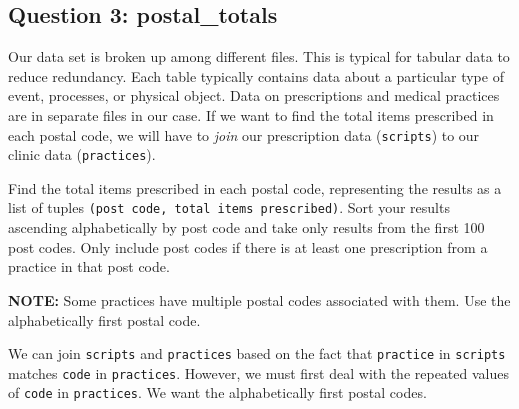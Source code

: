 \documentclass[11pt]{article}
\begin{document}
    \hypertarget{question-3-postal_totals}{%
\subsection{Question 3: postal\_totals}\label{question-3-postal_totals}}

Our data set is broken up among different files. This is typical for
tabular data to reduce redundancy. Each table typically contains data
about a particular type of event, processes, or physical object. Data on
prescriptions and medical practices are in separate files in our case.
If we want to find the total items prescribed in each postal code, we
will have to \emph{join} our prescription data (\texttt{scripts}) to our
clinic data (\texttt{practices}).

Find the total items prescribed in each postal code, representing the
results as a list of tuples
\texttt{(post\ code,\ total\ items\ prescribed)}. Sort your results
ascending alphabetically by post code and take only results from the
first 100 post codes. Only include post codes if there is at least one
prescription from a practice in that post code.

\textbf{NOTE:} Some practices have multiple postal codes associated with
them. Use the alphabetically first postal code.

    We can join \texttt{scripts} and \texttt{practices} based on the fact
that \texttt{\textquotesingle{}practice\textquotesingle{}} in
\texttt{scripts} matches
\texttt{\textquotesingle{}code\textquotesingle{}} in \texttt{practices}.
However, we must first deal with the repeated values of
\texttt{\textquotesingle{}code\textquotesingle{}} in \texttt{practices}.
We want the alphabetically first postal codes.
\end{document}
